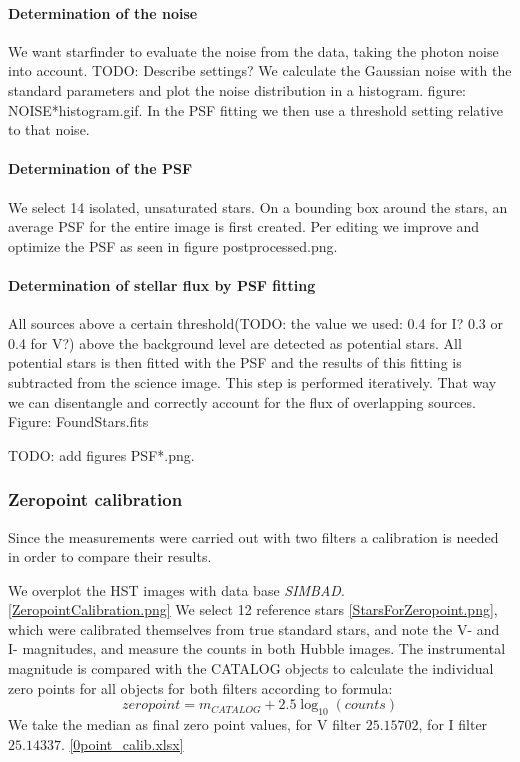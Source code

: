 \paragraph{Determination of the noise}
We want starfinder to evaluate the noise from the data, taking the photon noise into account. TODO: Describe settings? We calculate the Gaussian noise with the standard parameters and plot the noise distribution in a histogram. figure: NOISE*histogram.gif. In the PSF fitting we then use a threshold setting relative to that noise.

\paragraph{Determination of the PSF}
We select 14 isolated, unsaturated stars. On a bounding box around the stars, an average PSF for the entire image is first created. Per editing we improve and optimize the PSF as seen in figure postprocessed.png.

\paragraph{Determination of stellar flux by PSF fitting}
All sources above a certain threshold(TODO: the value we used: 0.4 for I? 0.3 or 0.4 for V?) above the background level are detected as potential stars. All potential stars is then fitted with the PSF and the results of this fitting is subtracted from the science image. This step is performed iteratively. That way we can disentangle and correctly account for the flux of overlapping sources. Figure: FoundStars.fits

TODO: add figures PSF*.png.

\subsubsection{Zeropoint calibration}
Since the measurements were carried out with two filters a calibration is needed in order to compare their results.

We overplot the HST images with data base \textit{SIMBAD}. \ref{ZeropointCalibration.png} We select 12 reference stars \ref{StarsForZeropoint.png}, which were calibrated themselves from true standard stars, and note the V- and I- magnitudes, and measure the counts in both Hubble images. The instrumental magnitude is compared with the CATALOG objects to calculate the individual zero points for all objects for both filters according to formula:
\begin{equation}
\label{calibration}
	zeropoint = m_{CATALOG} + 2.5 \log_{10}{(counts)}
\end{equation}
We take the median as final zero point values, for V filter $25.15702$, for I filter $25.14337$. \ref{0point_calib.xlsx} 

